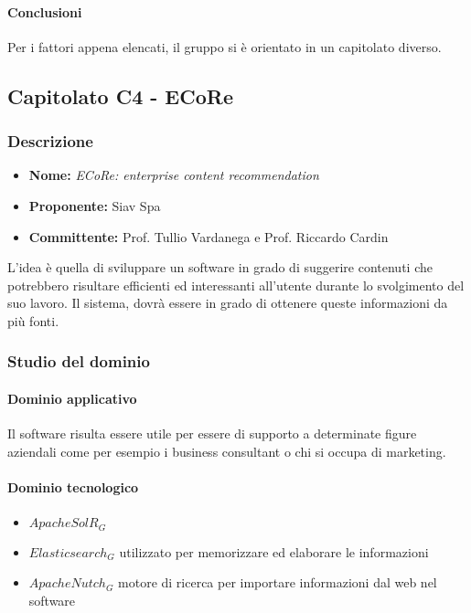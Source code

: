 	\paragraph{Conclusioni} \Spazio
	Per i fattori appena elencati, il gruppo si è orientato in un capitolato diverso.
	
	\subsection{Capitolato C4 - ECoRe}
	\subsubsection{Descrizione}
	\begin{itemize}
		\item \textbf{Nome:} \emph{ECoRe: enterprise content recommendation}
		\item \textbf{Proponente:} Siav Spa
		\item \textbf{Committente:} Prof. Tullio Vardanega e Prof. Riccardo Cardin
	\end{itemize}
    
    L'idea è quella di sviluppare un software in grado di suggerire contenuti che potrebbero risultare efficienti ed interessanti all'utente durante lo svolgimento del suo lavoro. Il sistema, dovrà essere in grado di ottenere queste informazioni da più fonti.
	
	\subsubsection{Studio del dominio} 
	\paragraph{Dominio applicativo} \Spazio
	Il software risulta essere utile per essere di supporto a determinate figure aziendali come per esempio i business consultant o chi si occupa di marketing.
	\paragraph{Dominio tecnologico}
		\begin{itemize}
		\item \textbf{$Apache SolR_G$} 
		\item \textbf{$Elasticsearch_G$} utilizzato per memorizzare ed elaborare le informazioni
		\item \textbf{$Apache Nutch_G$} motore di ricerca per importare informazioni dal web nel software
	\end{itemize}
	
